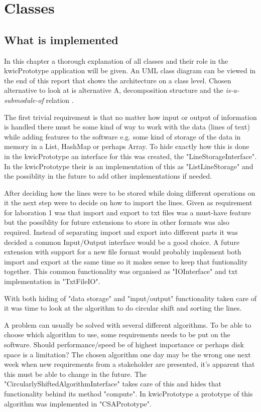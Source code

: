 \newpage
\section{Classes}
\subsection{What is implemented}
In this chapter a thorough explanation of all classes and their role in the
kwicPrototype application will be given. An UML class diagram can be viewed
in the end of this report that shows the architecture on a class level. Chosen
alternative to look at is alternative A, decomposition structure and the
{\em is-a-submodule-of} relation \cite{book:bass2012}.

The first trivial requirement is that no matter how input or output of information
is handled there must be some kind of way to work with the data (lines of text)
while adding features to the software e.g. some kind of storage of the data
in memory in a List, HashMap or perhaps Array. To hide exactly how this is done
in the kwicPrototype an interface for this was created, the "LineStorageInterface".
In the kwicPrototype their is an implementation of this as "ListLineStorage" and
the possiblity in the future to add other implementations if needed.

After deciding how the lines were to be stored while doing different operations
on it the next step were to decide on how to import the lines. Given as requirement
for laboration 1 was that import and export to txt files was a must-have feature but
the possiblity for future extensions to store in other formats was also required.
Instead of separating import and export into different parts it was decided a
common Input/Output interface would be a good choice. A future extension with
support for a new file format would probably implement both import and export
at the same time so it makes sense to keep that funtionality together. This
common functionality was organised as "IOInterface" and txt implementation in
"TxtFileIO".

With both hiding of "data storage" and "input/output" functionality taken care of
it was time to look at the algorithm to do circular shift and
sorting the lines.

A problem can usually be solved with several different algorithms.
To be able to choose which algorithm to use, some requirements needs to be put
on the software. Should performance/speed be of highest importance or perhaps
disk space is a limitation?
The chosen algorithm one day may be the wrong one next week when new requirements
from a stakeholder are presented, it's apparent that this must be able to change
in the future. The "CircularlyShiftedAlgorithmInterface" takes care of this and
hides that functionality behind its method "compute". In kwicPrototype a prototype
of this algorithm was implemented in "CSAPrototype".

